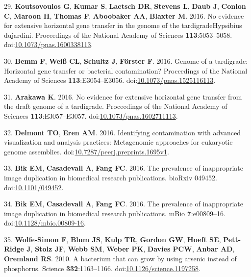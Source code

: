 \documentclass[11pt,]{article}
\begin{document}
\hypertarget{ref-Koutsovoulos2016b}{}
29. \textbf{Koutsovoulos G}, \textbf{Kumar S}, \textbf{Laetsch DR},
\textbf{Stevens L}, \textbf{Daub J}, \textbf{Conlon C}, \textbf{Maroon
H}, \textbf{Thomas F}, \textbf{Aboobaker AA}, \textbf{Blaxter M}. 2016.
No evidence for extensive horizontal gene transfer in the genome of the
tardigradeHypsibius dujardini. Proceedings of the National Academy of
Sciences \textbf{113}:5053--5058.
doi:\href{https://doi.org/10.1073/pnas.1600338113}{10.1073/pnas.1600338113}.

\hypertarget{ref-Bemm2016}{}
30. \textbf{Bemm F}, \textbf{Weiß CL}, \textbf{Schultz J},
\textbf{Förster F}. 2016. Genome of a tardigrade: Horizontal gene
transfer or bacterial contamination? Proceedings of the National Academy
of Sciences \textbf{113}:E3054--E3056.
doi:\href{https://doi.org/10.1073/pnas.1525116113}{10.1073/pnas.1525116113}.

\hypertarget{ref-Arakawa2016}{}
31. \textbf{Arakawa K}. 2016. No evidence for extensive horizontal gene
transfer from the draft genome of a tardigrade. Proceedings of the
National Academy of Sciences \textbf{113}:E3057--E3057.
doi:\href{https://doi.org/10.1073/pnas.1602711113}{10.1073/pnas.1602711113}.

\hypertarget{ref-Delmont2016}{}
32. \textbf{Delmont TO}, \textbf{Eren AM}. 2016. Identifying
contamination with advanced visualization and analysis practices:
Metagenomic approaches for eukaryotic genome assemblies.
doi:\href{https://doi.org/10.7287/peerj.preprints.1695v1}{10.7287/peerj.preprints.1695v1}.

\hypertarget{ref-Bik2016a}{}
33. \textbf{Bik EM}, \textbf{Casadevall A}, \textbf{Fang FC}. 2016. The
prevalence of inappropriate image duplication in biomedical research
publications. bioRxiv 049452.
doi:\href{https://doi.org/10.1101/049452}{10.1101/049452}.

\hypertarget{ref-Bik2016b}{}
34. \textbf{Bik EM}, \textbf{Casadevall A}, \textbf{Fang FC}. 2016. The
prevalence of inappropriate image duplication in biomedical research
publications. mBio \textbf{7}:e00809--16.
doi:\href{https://doi.org/10.1128/mbio.00809-16}{10.1128/mbio.00809-16}.

\hypertarget{ref-WolfeSimon2010}{}
35. \textbf{Wolfe-Simon F}, \textbf{Blum JS}, \textbf{Kulp TR},
\textbf{Gordon GW}, \textbf{Hoeft SE}, \textbf{Pett-Ridge J},
\textbf{Stolz JF}, \textbf{Webb SM}, \textbf{Weber PK}, \textbf{Davies
PCW}, \textbf{Anbar AD}, \textbf{Oremland RS}. 2010. A bacterium that
can grow by using arsenic instead of phosphorus. Science
\textbf{332}:1163--1166.
doi:\href{https://doi.org/10.1126/science.1197258}{10.1126/science.1197258}.
\end{document}
